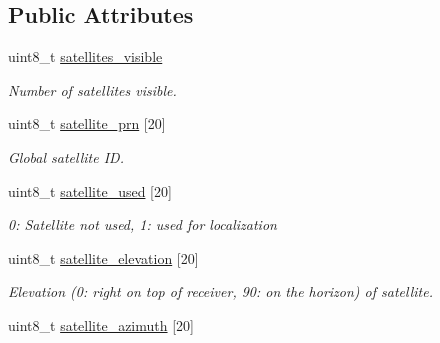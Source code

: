 \subsection*{Public Attributes}
\begin{DoxyCompactItemize}
\item 
\hypertarget{struct____mavlink__gps__status__t_aaf907a0b7ca1bf692b59b3c07269a72d}{uint8\+\_\+t \hyperlink{struct____mavlink__gps__status__t_aaf907a0b7ca1bf692b59b3c07269a72d}{satellites\+\_\+visible}}\label{struct____mavlink__gps__status__t_aaf907a0b7ca1bf692b59b3c07269a72d}

\begin{DoxyCompactList}\small\item\em Number of satellites visible. \end{DoxyCompactList}\item 
\hypertarget{struct____mavlink__gps__status__t_ab95bb265fee555d17a40a25b53c5fa40}{uint8\+\_\+t \hyperlink{struct____mavlink__gps__status__t_ab95bb265fee555d17a40a25b53c5fa40}{satellite\+\_\+prn} \mbox{[}20\mbox{]}}\label{struct____mavlink__gps__status__t_ab95bb265fee555d17a40a25b53c5fa40}

\begin{DoxyCompactList}\small\item\em Global satellite I\+D. \end{DoxyCompactList}\item 
\hypertarget{struct____mavlink__gps__status__t_a4f563283322cfea1b77374cb7db283ff}{uint8\+\_\+t \hyperlink{struct____mavlink__gps__status__t_a4f563283322cfea1b77374cb7db283ff}{satellite\+\_\+used} \mbox{[}20\mbox{]}}\label{struct____mavlink__gps__status__t_a4f563283322cfea1b77374cb7db283ff}

\begin{DoxyCompactList}\small\item\em 0\+: Satellite not used, 1\+: used for localization \end{DoxyCompactList}\item 
\hypertarget{struct____mavlink__gps__status__t_a8513963d43bac3d30179680f24601ac5}{uint8\+\_\+t \hyperlink{struct____mavlink__gps__status__t_a8513963d43bac3d30179680f24601ac5}{satellite\+\_\+elevation} \mbox{[}20\mbox{]}}\label{struct____mavlink__gps__status__t_a8513963d43bac3d30179680f24601ac5}

\begin{DoxyCompactList}\small\item\em Elevation (0\+: right on top of receiver, 90\+: on the horizon) of satellite. \end{DoxyCompactList}\item 
\hypertarget{struct____mavlink__gps__status__t_aef5900af3f2a1431059a28ef6f8a9a70}{uint8\+\_\+t \hyperlink{struct____mavlink__gps__status__t_aef5900af3f2a1431059a28ef6f8a9a70}{satellite\+\_\+azimuth} \mbox{[}20\mbox{]}}\label{struct____mavlink__gps__status__t_aef5900af3f2a1431059a28ef6f8a9a70}


\end{DoxyCompactItemize}
